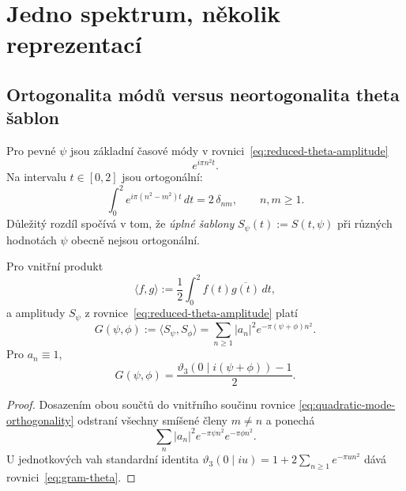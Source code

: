 \section{Jedno spektrum, několik reprezentací}

\subsection{Ortogonalita módů versus neortogonalita theta šablon}

Pro pevné $\psi$ jsou základní časové módy v rovnici~\eqref{eq:reduced-theta-amplitude}
\begin{equation}
  e^{i\pi n^2 t}.
\end{equation}
Na intervalu $t\in[0,2]$ jsou ortogonální:
\begin{equation}
 \int_0^2 e^{i\pi(n^2-m^2)t}\,dt
 = 2\,\delta_{nm},
 \qquad n,m\ge1.
 \label{eq:quadratic-mode-orthogonality}
\end{equation}
Důležitý rozdíl spočívá v tom, že \emph{úplné šablony}
$S_\psi(t):=S(t,\psi)$ při různých hodnotách $\psi$ obecně nejsou ortogonální.

\begin{theorem}
Pro vnitřní produkt
\begin{equation}
  \langle f,g\rangle:=\frac12\int_0^2 f(t)\overline{g(t)}\,dt,
\end{equation}
a amplitudy $S_\psi$ z rovnice~\eqref{eq:reduced-theta-amplitude} platí
\begin{equation}
  G(\psi,\phi)
  :=\langle S_\psi,S_\phi\rangle
  =\sum_{n\ge1}|a_n|^2e^{-\pi(\psi+\phi)n^2}.
  \label{eq:gram-general}
\end{equation}
Pro $a_n\equiv1$,
\begin{equation}
  G(\psi,\phi)
  =\frac{\vartheta_3(0\mid i(\psi+\phi))-1}{2}.
  \label{eq:gram-theta}
\end{equation}
\end{theorem}

\begin{proof}
Dosazením obou součtů do vnitřního součinu rovnice
\eqref{eq:quadratic-mode-orthogonality} odstraní všechny smíšené členy
$m\neq n$ a ponechá
\[
  \sum_n |a_n|^2 e^{-\pi\psi n^2}e^{-\pi\phi n^2}.
\]
U jednotkových vah standardní identita
$\vartheta_3(0\mid iu)=1+2\sum_{n\ge1}e^{-\pi u n^2}$ dává
rovnici~\eqref{eq:gram-theta}.
\end{proof}

